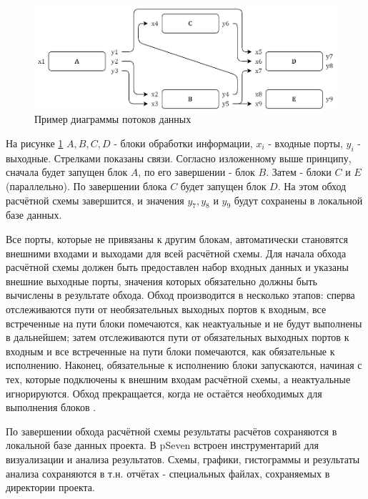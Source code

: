 \begin{figure}[h]
    \centering
    \includegraphics[width=\textwidth]{ResearchNotes/rndhpc_not_blo_2022_02_09/dataflow.png}
    \caption{Пример диаграммы потоков данных}
    \label{fig:dataflow}
\end{figure}

На рисунке \ref{fig:dataflow} $A, B, C, D$ - блоки обработки информации, $x_i$ - входные порты, $y_i$ - выходные. Стрелками показаны связи. Согласно изложенному выше принципу, сначала будет запущен блок $A$, по его завершении - блок $B$. Затем - блоки $C$ и $E$ (параллельно). По завершении блока $C$ будет запущен блок $D$. На этом обход расчётной схемы завершится, и значения $y_7, y_8$ и $y_9$ будут сохранены в локальной базе данных.

\begin{remark}
Все порты, которые не привязаны к другим блокам, автоматически становятся внешними входами и выходами для всей расчётной схемы. Для начала обхода расчётной схемы должен быть предоставлен набор входных данных и указаны внешние выходные порты, значения которых обязательно должны быть вычислены в результате обхода. Обход производится в несколько этапов: сперва отслеживаются пути от необязательных выходных портов к входным, все встреченные на пути блоки помечаются, как неактуальные и не будут выполнены в дальнейшем; затем отслеживаются пути от обязательных выходных портов к входным и все встреченные на пути блоки помечаются, как обязательные к исполнению. Наконец, обязательные к исполнению блоки запускаются, начиная с тех, которые подключены к внешним входам расчётной схемы, а неактуальные игнорируются. Обход прекращается, когда не остаётся необходимых для выполнения блоков \cite{Nazarenko2015}. 
\end{remark}

По завершении обхода расчётной схемы результаты расчётов сохраняются в локальной базе данных проекта. В pSeven встроен инструментарий для визуализации и анализа результатов. Схемы, графики, гистограммы и результаты анализа сохраняются в т.н. отчётах - специальных файлах, сохраняемых в директории проекта.


